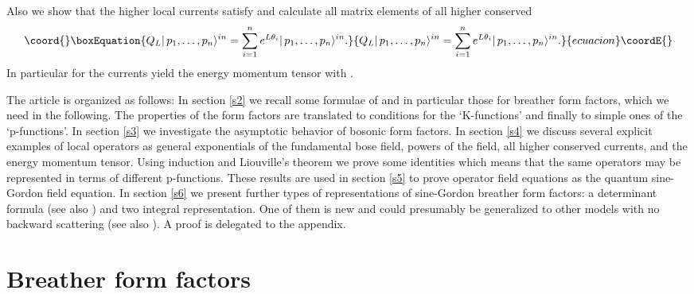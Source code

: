 \documentclass[a4paper,a4paper]{article}
\begin{document}
Also we show that the higher local currents \coordHE{} satisfy \coordHE{} and calculate all matrix elements of
all higher conserved \coordHE{}%
\begin{equation}\coord{}\boxEquation{
Q_{L}|\,p_{1},\dots ,p_{n}\rangle ^{in}=\sum_{i=1}^{n}e^{L\theta
_{i}}|\,p_{1},\dots ,p_{n}\rangle ^{in}.  \label{J}
}{
Q_{L}|\,p_{1},\dots ,p_{n}\rangle ^{in}=\sum_{i=1}^{n}e^{L\theta
_{i}}|\,p_{1},\dots ,p_{n}\rangle ^{in}.  }{ecuacion}\coordE{}\end{equation}
In particular for \coordHE{} the currents yield the energy momentum tensor \coordHE{} with \coordHE{}.

The article is organized as follows: In section \ref{s2} we recall some
formulae of \cite{BFKZ,BK} and in particular those for breather form
factors, which we need in the following. The properties of the form factors
are translated to conditions for the `K-functions' and finally to simple
ones of the `p-functions'. In section \ref{s3} we investigate the asymptotic
behavior of bosonic form factors. In section \ref{s4} we discuss several
explicit examples of local operators as general exponentials of the
fundamental bose field, powers of the field, all higher conserved currents,
and the energy momentum tensor. Using induction and Liouville's theorem we
prove some identities which means that the same operators may be represented
in terms of different p-functions. These results are used in section \ref{s5}
to prove operator field equations as the quantum sine-Gordon field equation.
In section \ref{s6} we present further types of representations of
sine-Gordon breather form factors: a determinant formula (see also \cite
{Sm1,AlZa1,FMS,KM}) and two integral representation. One of them is new and
could presumably be generalized to other models with no backward scattering
(see also \cite{Fr}). A proof is delegated to the appendix.

\section{Breather form factors\label{s2}}
\end{document}
